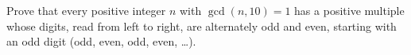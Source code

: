 Prove that every positive integer $n$ with $\gcd(n,10)=1$ has a positive multiple whose digits, read from left to right, are alternately odd and even, starting with an odd digit (odd, even, odd, even, \dots).
